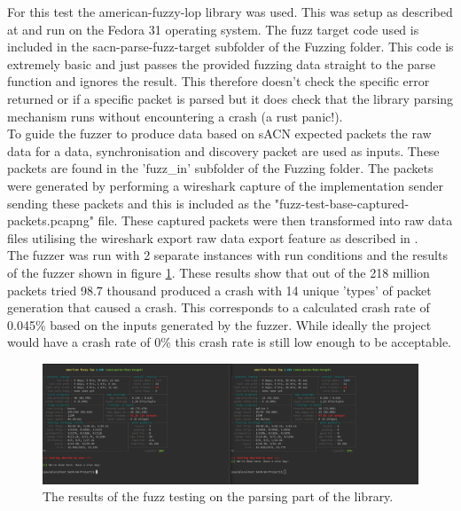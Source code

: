 \documentclass[11pt,a4paper]{article}
\begin{document}
For this test the american-fuzzy-lop library \cite{RUST_AFL_FUZZ} was used. This was setup as described at \cite{RUST_AFL_FUZZ_DOC} and run on the Fedora 31 operating system. The fuzz target code used is included in the sacn-parse-fuzz-target subfolder of the Fuzzing folder. This code is extremely basic and just passes the provided fuzzing data straight to the parse function and ignores the result. This therefore doesn't check the specific error returned or if a specific packet is parsed but it does check that the library parsing mechanism runs without encountering a crash (a rust panic!).\\

To guide the fuzzer to produce data based on sACN expected packets the raw data for a data, synchronisation and discovery packet are used as inputs. These packets are found in the 'fuzz\_in' subfolder of the Fuzzing folder. The packets were generated by performing a wireshark capture of the implementation sender sending these packets and this is included as the "fuzz-test-base-captured-packets.pcapng" file. These captured packets were then transformed into raw data files utilising the wireshark export raw data export feature as described in \cite{WIRESHARK_EXPORT_RAW}.\\

The fuzzer was run with 2 separate instances with run conditions and the results of the fuzzer shown in figure \ref{FUZZ_RESULTS}. These results show that out of the 218 million packets tried 98.7 thousand produced a crash with 14 unique 'types' of packet generation that caused a crash. This corresponds to a calculated crash rate of 0.045\% based on the inputs generated by the fuzzer. While ideally the project would have a crash rate of 0\% this crash rate is still low enough to be acceptable. 

\begin{figure}[H]
	\begin{turn}{90}
		\begin{minipage}[c][\textwidth][c]{\textheight}
			\centering
			\includegraphics[width=\textwidth]{Fuzzing_Terminal}
			\caption{The results of the fuzz testing on the parsing part of the library.}
			\label{FUZZ_RESULTS}
		\end{minipage}
	\end{turn}
\end{figure}
\end{document}
